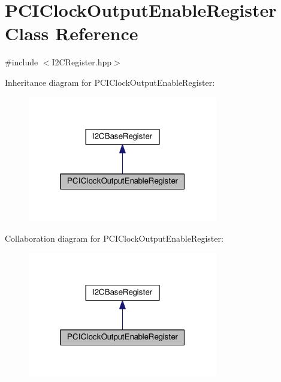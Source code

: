 \hypertarget{class_p_c_i_clock_output_enable_register}{}\section{P\+C\+I\+Clock\+Output\+Enable\+Register Class Reference}
\label{class_p_c_i_clock_output_enable_register}


{\ttfamily \#include $<$I2\+C\+Register.\+hpp$>$}



Inheritance diagram for P\+C\+I\+Clock\+Output\+Enable\+Register\+:\nopagebreak
\begin{figure}[H]
\begin{center}
\leavevmode
\includegraphics[width=235pt]{class_p_c_i_clock_output_enable_register__inherit__graph}
\end{center}
\end{figure}


Collaboration diagram for P\+C\+I\+Clock\+Output\+Enable\+Register\+:\nopagebreak
\begin{figure}[H]
\begin{center}
\leavevmode
\includegraphics[width=235pt]{class_p_c_i_clock_output_enable_register__coll__graph}
\end{center}
\end{figure}
